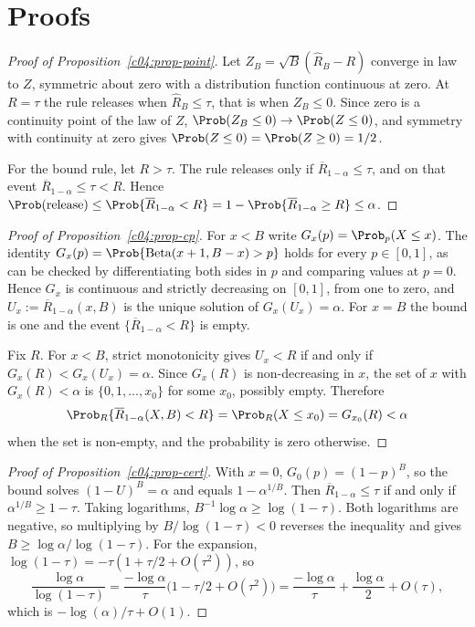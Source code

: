 \section{Proofs}

\begin{proof}[Proof of Proposition~\ref{c04:prop-point}]
Let $Z_B = \sqrt{B}(\widehat R_B - R)$ converge in law to $Z$, symmetric about zero with
a distribution function continuous at zero. At $R = \tau$ the rule releases when
$\widehat R_B \le \tau$, that is when $Z_B \le 0$. Since zero is a continuity point of
the law of $Z$, $\Prob(Z_B \le 0) \to \Prob(Z \le 0)$, and symmetry with continuity at
zero gives $\Prob(Z \le 0) = \Prob(Z \ge 0) = 1/2$.

For the bound rule, let $R > \tau$. The rule releases only if
$\overline{R}_{1-\alpha} \le \tau$, and on that event $\overline{R}_{1-\alpha} \le \tau
< R$. Hence
$\Prob(\text{release}) \le \Prob\{\overline{R}_{1-\alpha} < R\} = 1 -
\Prob\{\overline{R}_{1-\alpha} \ge R\} \le \alpha$.
\end{proof}

\begin{proof}[Proof of Proposition~\ref{c04:prop-cp}]
For $x < B$ write $G_x(p) = \Prob_p(X \le x)$. The identity
$G_x(p) = \Prob\{\mathrm{Beta}(x+1,B-x) > p\}$ holds for every $p \in [0,1]$, as can be
checked by differentiating both sides in $p$ and comparing values at $p = 0$. Hence
$G_x$ is continuous and strictly decreasing on $[0,1]$, from one to zero, and
$U_x := \overline{R}_{1-\alpha}(x,B)$ is the unique solution of $G_x(U_x) = \alpha$. For
$x = B$ the bound is one and the event $\{\overline{R}_{1-\alpha} < R\}$ is empty.

Fix $R$. For $x < B$, strict monotonicity gives $U_x < R$ if and only if
$G_x(R) < G_x(U_x) = \alpha$. Since $G_x(R)$ is non-decreasing in $x$, the set of $x$
with $G_x(R) < \alpha$ is $\{0,1,\dots,x_0\}$ for some $x_0$, possibly empty. Therefore
\[
\Prob_R\{\overline{R}_{1-\alpha}(X,B) < R\} = \Prob_R(X \le x_0) = G_{x_0}(R) < \alpha
\]
when the set is non-empty, and the probability is zero otherwise.
\end{proof}

\begin{proof}[Proof of Proposition~\ref{c04:prop-cert}]
With $x = 0$, $G_0(p) = (1-p)^B$, so the bound solves $(1-U)^B = \alpha$ and equals
$1 - \alpha^{1/B}$. Then $\overline{R}_{1-\alpha} \le \tau$ if and only if
$\alpha^{1/B} \ge 1-\tau$. Taking logarithms, $B^{-1}\log\alpha \ge \log(1-\tau)$.
Both logarithms are negative, so multiplying by $B/\log(1-\tau) < 0$ reverses the
inequality and gives $B \ge \log\alpha/\log(1-\tau)$. For the expansion,
$\log(1-\tau) = -\tau(1 + \tau/2 + O(\tau^2))$, so
\[
\frac{\log\alpha}{\log(1-\tau)} = \frac{-\log\alpha}{\tau}\big(1 - \tau/2 + O(\tau^2)\big)
= \frac{-\log\alpha}{\tau} + \frac{\log\alpha}{2} + O(\tau),
\]
which is $-\log(\alpha)/\tau + O(1)$.
\end{proof}

